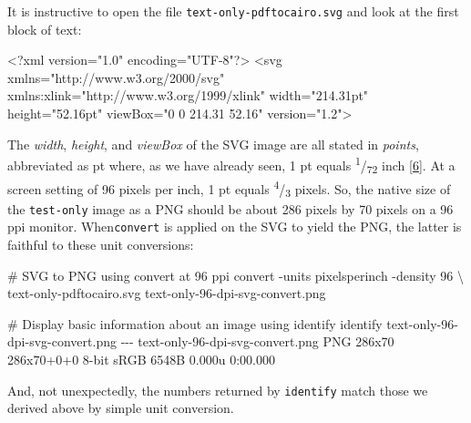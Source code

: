 \documentclass[
  a4paper,
]{article}
\newenvironment{Shaded}{\begin{snugshade}}{\end{snugshade}}
\newcommand{\AttributeTok}[1]{\textcolor[rgb]{0.80,0.80,0.80}{#1}}
\newcommand{\CommentTok}[1]{\textcolor[rgb]{0.50,0.62,0.50}{#1}}
\newcommand{\DataTypeTok}[1]{\textcolor[rgb]{0.87,0.87,0.75}{#1}}
\newcommand{\ErrorTok}[1]{\textcolor[rgb]{0.76,0.75,0.62}{#1}}
\newcommand{\ExtensionTok}[1]{\textcolor[rgb]{0.80,0.80,0.80}{#1}}
\newcommand{\KeywordTok}[1]{\textcolor[rgb]{0.94,0.87,0.69}{#1}}
\newcommand{\NormalTok}[1]{\textcolor[rgb]{0.80,0.80,0.80}{#1}}
\newcommand{\OtherTok}[1]{\textcolor[rgb]{0.94,0.94,0.56}{#1}}
\newcommand{\StringTok}[1]{\textcolor[rgb]{0.80,0.58,0.58}{#1}}
\begin{document}
It is instructive to open the file \texttt{text-only-pdftocairo.svg} and
look at the first block of text:

\begin{Shaded}
\begin{Highlighting}[]
\KeywordTok{\textless{}?xml}\NormalTok{ version="1.0" encoding="UTF{-}8"}\KeywordTok{?\textgreater{}}
\KeywordTok{\textless{}svg} \ErrorTok{xmlns}\OtherTok{=}\StringTok{"http://www.w3.org/2000/svg"} \ErrorTok{xmlns:xlink}\OtherTok{=}\StringTok{"http://www.w3.org/1999/xlink"} \ErrorTok{width}\OtherTok{=}\StringTok{"214.31pt"} \ErrorTok{height}\OtherTok{=}\StringTok{"52.16pt"} \ErrorTok{viewBox}\OtherTok{=}\StringTok{"0 0 214.31 52.16"} \ErrorTok{version}\OtherTok{=}\StringTok{"1.2"}\KeywordTok{\textgreater{}}
\end{Highlighting}
\end{Shaded}

The \emph{width}, \emph{height}, and \emph{viewBox} of the SVG image are
all stated in \emph{points}, abbreviated as pt where, as we have already
seen, 1 pt equals \textsuperscript{1}/\textsubscript{72} inch
{[}\protect\hyperlink{ref-oreilly2019}{6}{]}. At a screen setting of 96
pixels per inch, 1 pt equals \textsuperscript{4}/\textsubscript{3}
pixels. So, the native size of the \texttt{test-only} image as a PNG
should be about 286 pixels by 70 pixels on a 96 ppi monitor.
When\texttt{convert} is applied on the SVG to yield the PNG, the latter
is faithful to these unit conversions:

\begin{Shaded}
\begin{Highlighting}[]
\CommentTok{\# SVG to PNG using \textasciigrave{}convert\textasciigrave{} at 96 ppi}
\ExtensionTok{convert} \AttributeTok{{-}units}\NormalTok{ pixelsperinch }\AttributeTok{{-}density}\NormalTok{ 96 }\DataTypeTok{\textbackslash{}}
\NormalTok{text{-}only{-}pdftocairo.svg text{-}only{-}96{-}dpi{-}svg{-}convert.png}

\CommentTok{\# Display basic information about an image using \textasciigrave{}identify\textasciigrave{}}
\ExtensionTok{identify}\NormalTok{ text{-}only{-}96{-}dpi{-}svg{-}convert.png}
\ExtensionTok{{-}{-}{-}}
\ExtensionTok{text{-}only{-}96{-}dpi{-}svg{-}convert.png}\NormalTok{ PNG 286x70 286x70+0+0 8{-}bit sRGB 6548B 0.000u 0:00.000}
\end{Highlighting}
\end{Shaded}

And, not unexpectedly, the numbers returned by \texttt{identify} match
those we derived above by simple unit conversion.
\normalfont
\end{document}
